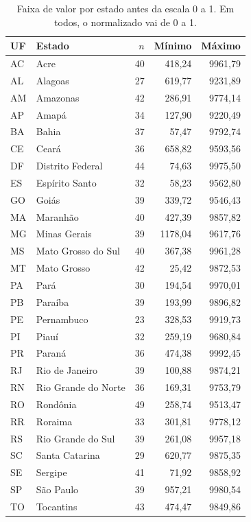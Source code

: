 \begin{table}[H]
    \centering
    \caption{Faixa de valor por estado antes da escala 0 a 1. Em todos, o normalizado vai de 0 a 1.}
    \label{tab:q6-estados}
    \scriptsize
    \setlength{\tabcolsep}{3pt}
    \begin{tabular}{@{}llrrr@{}}
        \toprule
        UF & Estado & \(n\) & Mínimo & Máximo \\
        \midrule
        AC & Acre                  & 40 &  418,24 & 9961,79 \\
        AL & Alagoas               & 27 &  619,77 & 9231,89 \\
        AM & Amazonas              & 42 &  286,91 & 9774,14 \\
        AP & Amapá                 & 34 &  127,90 & 9220,49 \\
        BA & Bahia                 & 37 &   57,47 & 9792,74 \\
        CE & Ceará                 & 36 &  658,82 & 9593,56 \\
        DF & Distrito Federal      & 44 &   74,63 & 9975,50 \\
        ES & Espírito Santo        & 32 &   58,23 & 9562,80 \\
        GO & Goiás                 & 39 &  339,72 & 9546,43 \\
        MA & Maranhão              & 40 &  427,39 & 9857,82 \\
        MG & Minas Gerais          & 39 & 1178,04 & 9617,76 \\
        MS & Mato Grosso do Sul    & 40 &  367,38 & 9961,28 \\
        MT & Mato Grosso           & 42 &   25,42 & 9872,53 \\
        PA & Pará                  & 30 &  194,54 & 9970,01 \\
        PB & Paraíba               & 39 &  193,99 & 9896,82 \\
        PE & Pernambuco            & 23 &  328,53 & 9919,73 \\
        PI & Piauí                 & 32 &  259,19 & 9680,84 \\
        PR & Paraná                & 36 &  474,38 & 9992,45 \\
        RJ & Rio de Janeiro        & 39 &  100,88 & 9874,21 \\
        RN & Rio Grande do Norte   & 36 &  169,31 & 9753,79 \\
        RO & Rondônia              & 49 &  258,74 & 9513,47 \\
        RR & Roraima               & 33 &  301,81 & 9778,12 \\
        RS & Rio Grande do Sul     & 39 &  261,08 & 9957,18 \\
        SC & Santa Catarina        & 29 &  620,77 & 9875,35 \\
        SE & Sergipe               & 41 &   71,92 & 9858,92 \\
        SP & São Paulo             & 39 &  957,21 & 9980,54 \\
        TO & Tocantins             & 43 &  474,47 & 9849,86 \\
        \bottomrule
    \end{tabular}
\end{table}
